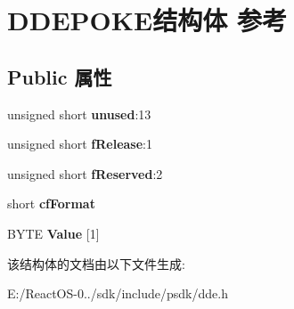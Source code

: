 \hypertarget{struct_d_d_e_p_o_k_e}{}\section{D\+D\+E\+P\+O\+K\+E结构体 参考}
\label{struct_d_d_e_p_o_k_e}
\subsection*{Public 属性}
\begin{DoxyCompactItemize}
\item 
\mbox{\label{struct_d_d_e_p_o_k_e_a0e221724b7637adbcb22ad959db4475b}} 
unsigned short {\bfseries unused}\+:13
\item 
\mbox{\label{struct_d_d_e_p_o_k_e_ac0ae829147fb321283c75cf4df74c549}} 
unsigned short {\bfseries f\+Release}\+:1
\item 
\mbox{\label{struct_d_d_e_p_o_k_e_a58bb3f29db390df9643fb7e2f9c6ff43}} 
unsigned short {\bfseries f\+Reserved}\+:2
\item 
\mbox{\label{struct_d_d_e_p_o_k_e_a063269c1bd86fb569c1fa6d45fb8772b}} 
short {\bfseries cf\+Format}
\item 
\mbox{\label{struct_d_d_e_p_o_k_e_a073174a4fd4bda486dc4b101403b6efb}} 
B\+Y\+TE {\bfseries Value} \mbox{[}1\mbox{]}
\end{DoxyCompactItemize}


该结构体的文档由以下文件生成\+:\begin{DoxyCompactItemize}
\item 
E\+:/\+React\+O\+S-\/0../sdk/include/psdk/dde.\+h\end{DoxyCompactItemize}
